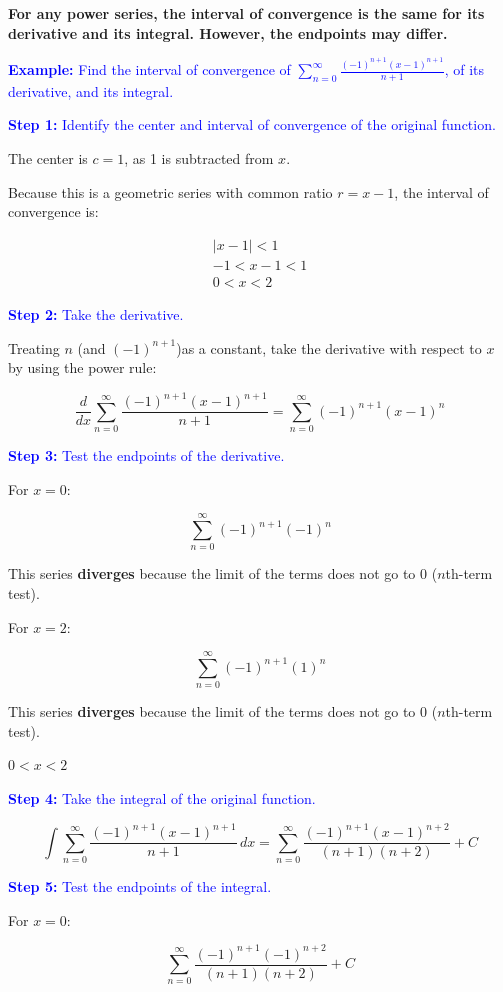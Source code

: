 \documentclass[letterpaper, 12pt]{article}
\newcommand{\example}[1]{\textcolor{blue}{\textbf{Example:} #1}}
\newcommand{\step}[2]{\textcolor{blue}{\textbf{Step #1:} #2}}
\begin{document}
\textbf{For any power series, the interval of convergence is the same for its derivative and its integral. However, the endpoints may differ.}

\example{Find the interval of convergence of $\displaystyle \sum_{n=0}^\infty \frac{(-1)^{n+1}(x-1)^{n+1}}{n+1}$, of its derivative, and its integral.}

\step{1}{Identify the center and interval of convergence of the original function.}

The center is $c = 1$, as 1 is subtracted from $x$.

Because this is a geometric series with common ratio $r = x-1$, the interval of convergence is:

\begin{gather*}
|x-1| < 1 \\
-1 < x-1 < 1 \\
\boxed{0 < x < 2}
\end{gather*}

\step{2}{Take the derivative.}

Treating $n$ (and $(-1)^{n+1}$)as a constant, take the derivative with respect to $x$ by using the power rule:

$$ \frac{d}{dx} \displaystyle \sum_{n=0}^\infty \frac{(-1)^{n+1}(x-1)^{n+1}}{n+1} = \displaystyle \sum_{n=0}^\infty (-1)^{n+1}(x-1)^n$$

\step{3}{Test the endpoints of the derivative.}

For $x=0$:

$$\displaystyle \sum_{n=0}^\infty (-1)^{n+1}(-1)^n$$

This series \textbf{diverges} because the limit of the terms does not go to 0 ($n$th-term test).

For $x=2$:

$$\displaystyle \sum_{n=0}^\infty (-1)^{n+1}(1)^n$$

This series \textbf{diverges} because the limit of the terms does not go to 0 ($n$th-term test).

$\boxed{ 0 < x < 2}$

\step{4}{Take the integral of the original function.}

$$\int \displaystyle \sum_{n=0}^\infty \frac{(-1)^{n+1}(x-1)^{n+1}}{n+1} \, dx = \displaystyle \sum_{n=0}^\infty \frac{(-1)^{n+1}(x-1)^{n+2}}{(n+1)(n+2)} + C$$

\step{5}{Test the endpoints of the integral.}

For $x=0$:

$$\displaystyle \sum_{n=0}^\infty \frac{(-1)^{n+1}(-1)^{n+2}}{(n+1)(n+2)} + C$$
\end{document}
